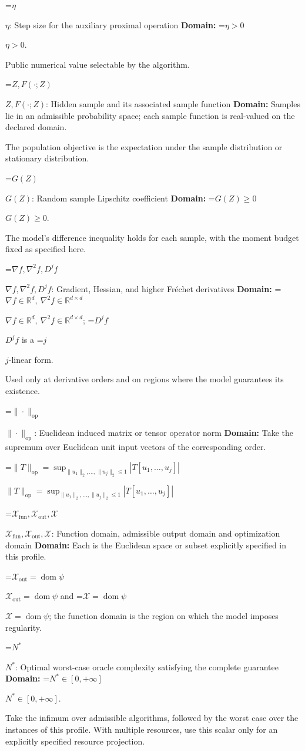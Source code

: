 \documentclass[10pt,a4paper]{article}
\newcommand{\AtlasMath}[1]{\par\begingroup\centering\setbox0=\hbox{$\displaystyle #1$}\ifdim\wd0>1.4\linewidth\typeout{ATLAS WIDE FORMULA: \the\wd0}\fi\ifdim\wd0>\linewidth\resizebox{\linewidth}{!}{\box0}\else\box0\fi\par\endgroup}
\newcommand{\AtlasInlineMath}[1]{\begingroup\setbox0=\hbox{$#1$}\ifdim\wd0>.4\linewidth\endgroup\AtlasMath{#1}\else\endgroup$#1$\fi}
\begin{document}
\AtlasInlineMath{\eta}: Step size for the auxiliary proximal operation \textbf{Domain:} \AtlasInlineMath{\eta>0}.

Public numerical value selectable by the algorithm.

\AtlasInlineMath{Z,F(\cdot;Z)}: Hidden sample and its associated sample function \textbf{Domain:} Samples lie in an admissible probability space; each sample function is real-valued on the declared domain.

The population objective is the expectation under the sample distribution or stationary distribution.

\AtlasInlineMath{G(Z)}: Random sample Lipschitz coefficient \textbf{Domain:} \AtlasInlineMath{G(Z)\ge0}.

The model's difference inequality holds for each sample, with the moment budget fixed as specified here.

\AtlasInlineMath{\nabla f,\nabla^2f,D^jf}: Gradient, Hessian, and higher Fréchet derivatives \textbf{Domain:} \AtlasInlineMath{\nabla f\in\mathbb{R}^d,\ \nabla^2f\in\mathbb{R}^{d\times d}}; \AtlasInlineMath{D^jf} is a \AtlasInlineMath{j}-linear form.

Used only at derivative orders and on regions where the model guarantees its existence.

\AtlasInlineMath{\|\cdot\|_{\mathrm{op}}}: Euclidean induced matrix or tensor operator norm \textbf{Domain:} Take the supremum over Euclidean unit input vectors of the corresponding order.

\AtlasInlineMath{\|T\|_{\mathrm{op}}=\sup_{\|u_1\|_2,\ldots,\|u_j\|_2\le1}|T[u_1,\ldots,u_j]|}

\AtlasInlineMath{\mathcal{X}_{\mathrm{fun}},\mathcal{X}_{\mathrm{out}},\mathcal{X}}: Function domain, admissible output domain and optimization domain \textbf{Domain:} Each is the Euclidean space or subset explicitly specified in this profile.

\AtlasInlineMath{\mathcal{X}_{\mathrm{out}}=\operatorname{dom}\psi} and \AtlasInlineMath{\mathcal{X}=\operatorname{dom}\psi}; the function domain is the region on which the model imposes regularity.

\AtlasInlineMath{N^*}: Optimal worst-case oracle complexity satisfying the complete guarantee \textbf{Domain:} \AtlasInlineMath{N^*\in[0,+\infty]}.

Take the infimum over admissible algorithms, followed by the worst case over the instances of this profile. With multiple resources, use this scalar only for an explicitly specified resource projection.
\end{document}
